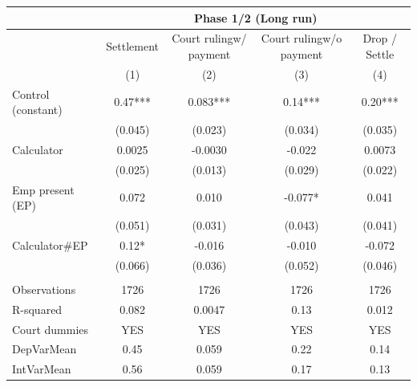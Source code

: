 \begin{tabular}{lcccc}
\toprule
      & \multicolumn{4}{c}{Phase 1/2 (Long run)} \\
\midrule
      & Settlement & \multicolumn{1}{p{4.835em}}{Court ruling\newline{}w/ payment} & \multicolumn{1}{p{4.055em}}{Court ruling\newline{}w/o payment} & Drop / Settle \\
\midrule
\midrule
      & (1)   & (2)   & (3)   & (4) \\
\midrule
\midrule
Control (constant) & 0.47*** & 0.083*** & 0.14*** & 0.20*** \\
      & (0.045) & (0.023) & (0.034) & (0.035) \\
Calculator & 0.0025 & -0.0030 & -0.022 & 0.0073 \\
      & (0.025) & (0.013) & (0.029) & (0.022) \\
Emp present (EP) & 0.072 & 0.010 & -0.077* & 0.041 \\
      & (0.051) & (0.031) & (0.043) & (0.041) \\
Calculator\#EP & 0.12* & -0.016 & -0.010 & -0.072 \\
      & (0.066) & (0.036) & (0.052) & (0.046) \\
      &       &       &       &  \\
\midrule
Observations & 1726  & 1726  & 1726  & 1726 \\
R-squared & 0.082 & 0.0047 & 0.13  & 0.012 \\
Court dummies  & YES   & YES   & YES   & YES \\
DepVarMean & 0.45  & 0.059 & 0.22  & 0.14 \\
IntVarMean & 0.56  & 0.059 & 0.17  & 0.13 \\
\bottomrule
\bottomrule
\end{tabular}%
